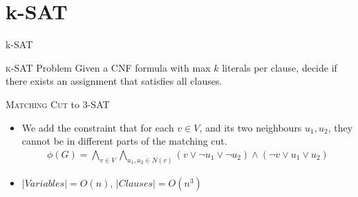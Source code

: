 \documentclass[
	xcolor={svgnames},
	hyperref={pagebackref,bookmarks},
	aspectratio=43,
]{beamer}
\begin{document}
\section{k-SAT}
\begin{frame}{k-SAT}
	\begin{block}{\textsc{k-SAT} Problem}
		Given a CNF formula with max $k$ literals per clause, decide if there exists an assignment that satisfies all clauses.
	\end{block}
	\begin{block}{\textsc{Matching Cut} to \textsc{3-SAT}}
		\begin{itemize}
			\item We add the constraint that for each $v \in V$, and its two neighbours $u_1, u_2$, they cannot be in different parts of the matching cut.
			\begin{align}
				\phi(G) = \bigwedge_{v \in V} \bigwedge_{u_1, u_2 \in N(v)} (v \vee \neg u_1 \vee \neg u_2) \wedge (\neg v \vee u_1 \vee u_2)
			\end{align} 
			\item $|Variables| = O(n)$, $|Clauses| = O(n^3)$
		\end{itemize}
	\end{block}
\end{frame}
\end{document}
